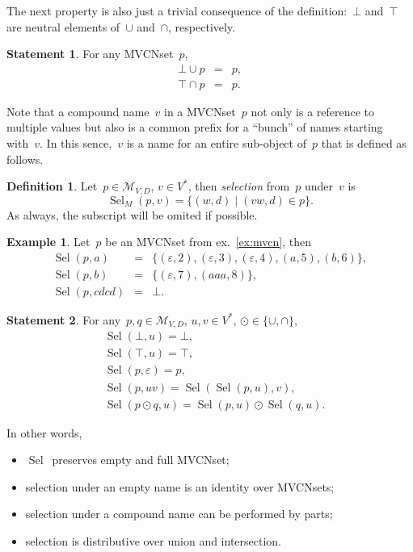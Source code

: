\documentclass{article}
\theoremstyle{definition}
\newtheorem{Df}{Definition}
\newtheorem{St}{Statement}
\newtheorem{Ex}{Example}
\newcommand{\setcharmvcn}{M}
\newcommand{\setsymbol}[3]{\mathcal{#1}_{#2,#3}}
\newcommand{\setmvcn}[2]{\setsymbol{\setcharmvcn}{#1}{#2}}
\newcommand{\select}{\operatorname{Sel}}
\begin{document}
The next property is also just a trivial consequence of the definition:~$\bot$
and~$\top$ are neutral elements of~$\cup$ and~$\cap$, respectively.
\begin{St}\label{st:mvcn-neutrals}
For any MVCNset~$p$,
\begin{eqnarray*}
  \bot \cup p & = & p, \\
  \top \cap p & = & p .
\end{eqnarray*}
\end{St}

Note that a compound name~$v$ in a MVCNset~$p$ not only is a reference to
multiple values but also is a common prefix for a ``bunch'' of names starting
with~$v$. In this sence,~$v$ is a name for an entire sub-object of~$p$ that is
defined as follows.
\begin{Df}\label{df:mvcn-select}
Let~$p\in\setmvcn{V}{D}$, $v\in V^\ast$, then \emph{selection} from~$p$
under~$v$ is
\[
  \select_\setcharmvcn(p,v) = \{ (w, d) \mid (vw, d)\in p \} .
\]
As always, the subscript will be omited if possible.
\end{Df}

\begin{Ex}\label{ex:mvcn-select}
Let~$p$ be an MVCNset from ex.~\ref{ex:mvcn}, then
\begin{eqnarray*}
  \select(p, a) & = & \{
    (\varepsilon, 2),
    (\varepsilon, 3),
    (\varepsilon, 4),
    (a,           5),
    (b,           6)
  \} , \\
  \select(p, b) & = & \{
    (\varepsilon, 7),
    (aaa,         8)
  \} , \\
  \select(p, cdcd) & = & \bot .
\end{eqnarray*}
\end{Ex}

\begin{St}\label{st:mvcn-selection-properties}
For any~$p,q\in\setmvcn{V}{D}$, $u, v\in V^\ast$, $\odot\in\{\cup, \cap\}$,
\begin{eqnarray*}
  & \select(\bot,u) = \bot, \\
  & \select(\top,u) = \top, \\
  & \select(p,\varepsilon) = p, \\
  & \select(p,uv) = \select(\select(p,u), v), \\
  & \select(p\odot q, u) = \select(p,u)\odot \select(q,u).
\end{eqnarray*}
\end{St}
In other words,
\begin{itemize}
\item $\select$~preserves empty and full MVCNset;
\item selection under an empty name is an identity over MVCNsets;
\item selection under a compound name can be performed by parts;
\item selection is distributive over union and intersection.
\end{itemize}
\end{document}
